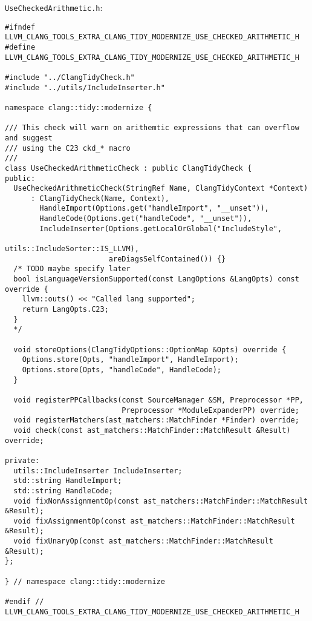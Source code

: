 \texttt{UseCheckedArithmetic.h}:
{\scriptsize
\begin{verbatim}
#ifndef LLVM_CLANG_TOOLS_EXTRA_CLANG_TIDY_MODERNIZE_USE_CHECKED_ARITHMETIC_H
#define LLVM_CLANG_TOOLS_EXTRA_CLANG_TIDY_MODERNIZE_USE_CHECKED_ARITHMETIC_H

#include "../ClangTidyCheck.h"
#include "../utils/IncludeInserter.h"

namespace clang::tidy::modernize {

/// This check will warn on arithemtic expressions that can overflow and suggest
/// using the C23 ckd_* macro
///
class UseCheckedArithmeticCheck : public ClangTidyCheck {
public:
  UseCheckedArithmeticCheck(StringRef Name, ClangTidyContext *Context)
      : ClangTidyCheck(Name, Context),
        HandleImport(Options.get("handleImport", "__unset")),
        HandleCode(Options.get("handleCode", "__unset")),
        IncludeInserter(Options.getLocalOrGlobal("IncludeStyle",
                                                 utils::IncludeSorter::IS_LLVM),
                        areDiagsSelfContained()) {}
  /* TODO maybe specify later
  bool isLanguageVersionSupported(const LangOptions &LangOpts) const override {
    llvm::outs() << "Called lang supported";
    return LangOpts.C23;
  }
  */

  void storeOptions(ClangTidyOptions::OptionMap &Opts) override {
    Options.store(Opts, "handleImport", HandleImport);
    Options.store(Opts, "handleCode", HandleCode);
  }

  void registerPPCallbacks(const SourceManager &SM, Preprocessor *PP,
                           Preprocessor *ModuleExpanderPP) override;
  void registerMatchers(ast_matchers::MatchFinder *Finder) override;
  void check(const ast_matchers::MatchFinder::MatchResult &Result) override;

private:
  utils::IncludeInserter IncludeInserter;
  std::string HandleImport;
  std::string HandleCode;
  void fixNonAssignmentOp(const ast_matchers::MatchFinder::MatchResult &Result);
  void fixAssignmentOp(const ast_matchers::MatchFinder::MatchResult &Result);
  void fixUnaryOp(const ast_matchers::MatchFinder::MatchResult &Result);
};

} // namespace clang::tidy::modernize

#endif // LLVM_CLANG_TOOLS_EXTRA_CLANG_TIDY_MODERNIZE_USE_CHECKED_ARITHMETIC_H

\end{verbatim}

}


